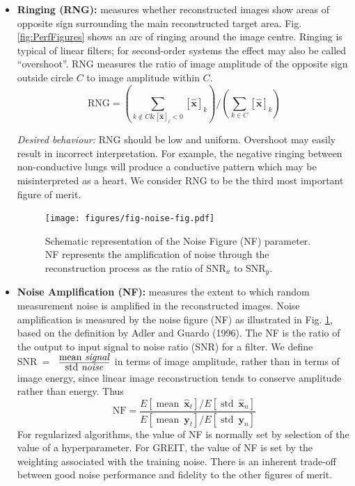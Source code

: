\documentclass[12pt]{iopart}
\newcommand{\xH}{\mbox{$\mathbf{\hat x}$}}
\newcommand{\yB}{\mbox{$\mathbf{y}$}}
\begin{document}
\begin{itemize}
\hspace{5mm}
{\em Desired behaviour:}
SD should be low and uniform. Large SD may result in
incorrect interpretation of images, although this
effect is less important than other artefacts. We 
consider SD to be the fifth most important figure 
of merit.

\item
{\bf Ringing (RNG):}
measures whether reconstructed images show
areas of opposite sign surrounding the main 
reconstructed target area. Fig. \ref{fig:PerfFigures}
shows an arc of ringing around the image centre.
Ringing is typical of linear filters; for second-order
systems the effect may also be called ``overshoot''.
RNG measures the ratio of image amplitude of
the opposite sign outside circle $C$ to image
amplitude within $C$.
\begin{equation}
\mathrm{RNG} =
\left(
        \sum_{k\not\in C \& [\xH]_i < 0} [\xH]_k 
\right)
/ 
\left(
        \sum_{k\in C}                    [\xH]_k 
\right)
\end{equation}

\hspace{5mm}
{\em Desired behaviour:}
RNG should be low and uniform. Overshoot may
easily result in incorrect interpretation. For
example, the negative ringing between non-conductive
lungs will produce a conductive pattern which 
may be misinterpreted as a heart.
We consider RNG to be the third most important figure 
of merit.

\begin{figure}[bhtp]
\begin{center}
\texttt{[image: figures/fig-noise-fig.pdf]}
\caption{ \label{fig:noise_fig}
Schematic representation of the Noise Figure (NF)
parameter. NF represents the amplification of noise through
the reconstruction process as the ratio of SNR$_x$ to SNR$_y$.
}
\end{center}
\end{figure}

\item
{\bf Noise Amplification (NF):}
measures the extent to which random
measurement noise is amplified
in the reconstructed images. Noise amplification
is measured by the noise figure (NF) as
illustrated in Fig. \ref{fig:noise_fig}, 
based on the definition by Adler and Guardo (1996).
The NF is the ratio of the output to input
 signal to noise ratio (SNR) for a filter.
We define SNR~=~%
$\frac{
   \mbox{mean \em signal}
      }{
   \mbox{std \em noise}
     }
$ 
in terms of image amplitude,
rather than in terms of image energy, since linear
image reconstruction tends to conserve  amplitude
rather than energy. Thus
\begin{equation}
\mathrm{NF} = \frac{
   E[ \mathop{mean}~\xH_t ] 
         /
   E[ \mathop{std}~\xH_n ]
}{
   E[ \mathop{mean}~\yB_t ] 
         /
   E[ \mathop{std}~\yB_n ]
}
\end{equation}
For regularized algorithms, the value of NF is normally
set by selection of the value of 
a hyperparameter. For GREIT, the value of NF is set by the weighting
associated with the training noise. There is an inherent
trade-off between good noise performance and fidelity to
the other figures of merit.


\end{itemize}
\end{document}
